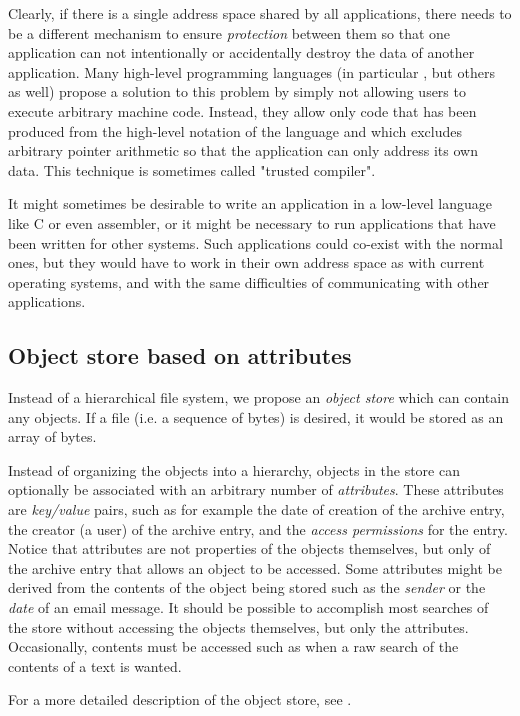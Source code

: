 Clearly, if there is a single address space shared by all
applications, there needs to be a different mechanism to ensure
\emph{protection} between them so that one application can not
intentionally or accidentally destroy the data of another application.
Many high-level programming languages (in particular \lisp{}, but
others as well) propose a solution to this problem by simply not
allowing users to execute arbitrary machine code.  Instead, they allow
only code that has been produced from the high-level notation of the
language and which excludes arbitrary pointer arithmetic so that the
application can only address its own data.  This technique is
sometimes called "trusted compiler".

It might sometimes be desirable to write an application in a
low-level language like C or even assembler, or it might be
necessary to run applications that have been written for other
systems.  Such applications could co-exist with the normal ones, but
they would have to work in their own address space as with current
operating systems, and with the same difficulties of communicating
with other applications.  

\subsection{Object store based on attributes}

Instead of a hierarchical file system, we propose an \emph{object
  store} which can contain any objects.  If a file (i.e. a
sequence of bytes) is desired, it would be stored as an array of
bytes.

Instead of organizing the objects into a hierarchy, objects in the
store can optionally be associated with an arbitrary number
of \emph{attributes}.  These attributes are \emph{key/value} pairs, such as for
example the date of creation of the archive entry, the creator (a
user) of the archive entry, and the \emph{access permissions} for
the entry.  Notice that attributes are not properties of the objects
themselves, but only of the archive entry that allows an object to
be accessed.  Some attributes might be derived from the contents of the
object being stored such as the \emph{sender} or the \emph{date} of
an email message.  It should be possible to accomplish most searches
of the store without accessing the objects themselves, but only the
attributes.  Occasionally, contents must be accessed such as when a raw
search of the contents of a text is wanted. 

For a more detailed description of the object store, see
. 

